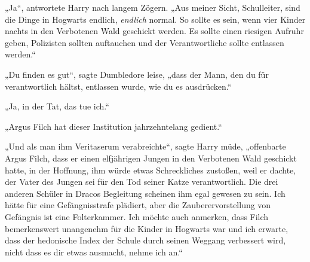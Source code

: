 „Ja“, antwortete Harry nach langem Zögern. „Aus meiner Sicht, Schulleiter, sind die Dinge in Hogwarts endlich, \emph{endlich} normal. So sollte es sein, wenn vier Kinder nachts in den Verbotenen Wald geschickt werden. Es sollte einen riesigen Aufruhr geben, Polizisten sollten auftauchen und der Verantwortliche sollte entlassen werden.“

„Du finden es gut“, sagte Dumbledore leise, „dass der Mann, den du für verantwortlich hältst, entlassen wurde, wie du es ausdrücken.“

„Ja, in der Tat, das tue ich.“

„Argus Filch hat dieser Institution jahrzehntelang gedient.“

„Und als man ihm Veritaserum verabreichte“, sagte Harry müde, „offenbarte Argus Filch, dass er einen elfjährigen Jungen in den Verbotenen Wald geschickt hatte, in der Hoffnung, ihm würde etwas Schreckliches zustoßen, weil er dachte, der Vater des Jungen sei für den Tod seiner Katze verantwortlich. Die drei anderen Schüler in Dracos Begleitung scheinen ihm egal gewesen zu sein. Ich hätte für eine Gefängnisstrafe plädiert, aber die Zauberervorstellung von Gefängnis ist eine Folterkammer. Ich möchte auch anmerken, dass Filch bemerkenswert unangenehm für die Kinder in Hogwarts war und ich erwarte, dass der hedonische Index der Schule durch seinen Weggang verbessert wird, nicht dass es dir etwas ausmacht, nehme ich an.“


